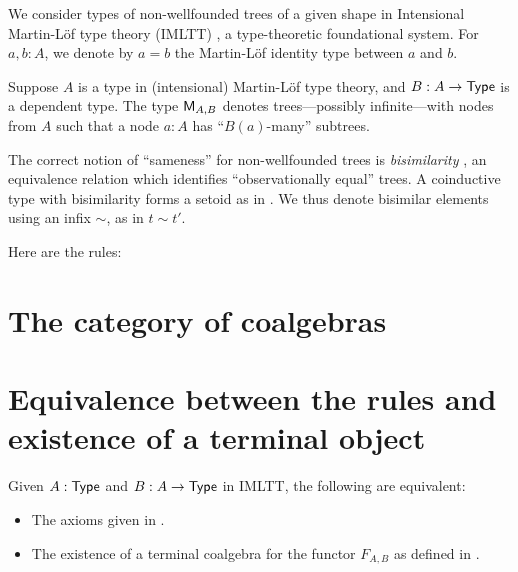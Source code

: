 \documentclass[envcountsame]{llncs}
\begin{document}
We consider types of non-wellfounded trees of a given shape in Intensional Martin-L\"of type theory (IMLTT) \parencite{martin_lof}, 
a type-theoretic foundational system.
For $a,b : A$, we denote by $a = b$ the Martin-L\"of identity type between $a$ and $b$.


Suppose $A$ is a type in (intensional) Martin-L\"of type theory, and $B : A \to \mathsf{Type}$ is a dependent type.
The type $\mathsf{M}_{A,B}$ denotes trees---possibly infinite---with nodes 
from $A$ such that a node $a:A$ has \enquote{$B(a)$-many} subtrees.

The correct notion of \enquote{sameness} for non-wellfounded trees is \emph{bisimilarity} 
\parencite{DBLP:conf/types/Coquand93, DBLP:journals/corr/abs-cs-0603119},
an equivalence relation which identifies \enquote{observationally equal} trees.
A coinductive type with bisimilarity forms a setoid as in .
We thus denote bisimilar elements using an infix $\sim$, as in $t \sim t'$. 

Here are the rules:





\section{The category of coalgebras}




\section{Equivalence between the rules and existence of a terminal object}

\begin{lemma}
  Given $A:\mathsf{Type}$ and $B:A\to\mathsf{Type}$ in IMLTT, the following are equivalent:
 \begin{itemize}
  \item The axioms given in .
  \item The existence of a terminal coalgebra for the functor $F_{A,B}$ as defined in .
 \end{itemize}

\end{lemma}

 
\printbibliography


\appendix
\end{document}
